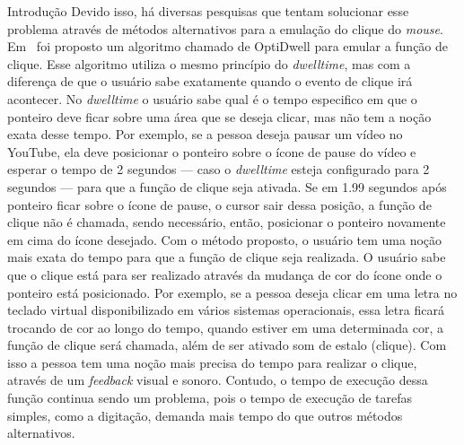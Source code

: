 \begin{chapter}{Introdução}
Devido isso, há diversas pesquisas que tentam solucionar esse problema através de
métodos alternativos para a emulação do clique do \textit{mouse}.
Em~\cite{Aanand18} foi proposto um algoritmo chamado de OptiDwell para emular a
função de clique. Esse algoritmo utiliza o mesmo princípio do
\textit{dwelltime}, mas com a diferença de que o usuário sabe exatamente quando
o evento de clique irá acontecer. No \textit{dwelltime} o usuário sabe qual é o
tempo especifico em que o ponteiro deve ficar sobre uma área que se deseja
clicar, mas não tem a noção exata desse tempo. Por exemplo, se a pessoa deseja
pausar um vídeo no YouTube, ela deve posicionar o ponteiro sobre o ícone de
pause do vídeo e esperar o tempo de 2 segundos --- caso o \textit{dwelltime}
esteja configurado para 2 segundos --- para que a função de clique seja ativada.
Se em 1.99 segundos após ponteiro ficar sobre o ícone de pause, o cursor sair
dessa posição, a função de clique não é chamada, sendo necessário, então,
posicionar o ponteiro novamente em cima do ícone desejado. Com o método
proposto, o usuário tem uma noção mais exata do tempo para que a função de clique
seja realizada. O usuário sabe que o clique está para ser realizado através da
mudança de cor do ícone onde o ponteiro está posicionado. Por exemplo, se a
pessoa deseja clicar em uma letra no teclado virtual disponibilizado em vários
sistemas operacionais, essa letra ficará trocando de cor ao longo do tempo,
quando estiver em uma determinada cor, a função de clique será chamada, além de
ser ativado som de estalo (clique). Com isso a pessoa tem uma noção mais precisa
do tempo para realizar o clique, através de um \textit{feedback} visual e
sonoro. Contudo, o tempo de execução dessa função continua sendo um problema,
pois o tempo de execução de tarefas simples, como a digitação, demanda mais
tempo do que outros métodos alternativos.


\end{chapter}
